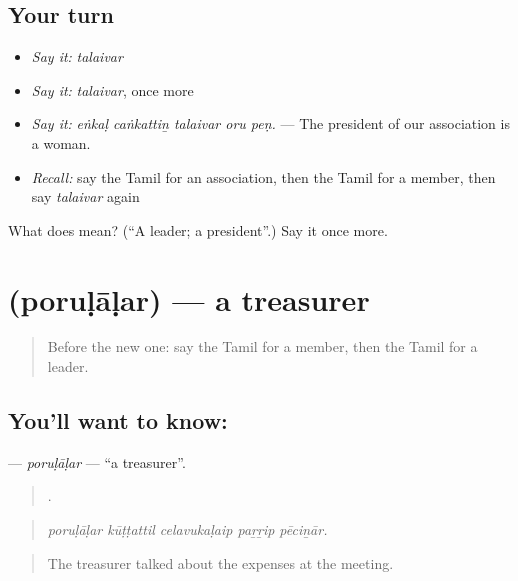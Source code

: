 \subsection*{Your turn}
\begin{itemize}
\raggedright
  \item \emph{Say it:} \emph{talaivar}
  \item \emph{Say it:} \emph{talaivar}, once more
  \item \emph{Say it:} \emph{eṅkaḷ caṅkattiṉ talaivar oru peṇ.} — The president of our association is a woman.
  \item \emph{Recall:} say the Tamil for an association, then the Tamil for a member, then say \emph{talaivar} again
\end{itemize}

\begin{tcolorbox}[breakable,colback=teal!4,colframe=teal!35!black,title={Before you move on}]
What does  mean? (\textquotedblleft{}A leader; a president\textquotedblright{}.) Say it once more.
\end{tcolorbox}
\section[\texorpdfstring{\ta{பொருளாளர்} (poruḷāḷar)}{பொருளாளர் (poruḷāḷar)}]{ (poruḷāḷar) — a treasurer}

\label{lesson:TA-C378-porulalar}



\begin{quote}
Before the new one: say the Tamil for a member, then the Tamil for a leader.
\end{quote}

\subsection*{You'll want to know: }
\textbf{} — \emph{poruḷāḷar} — \textquotedblleft{}a treasurer\textquotedblright{}.

\begin{quote}
    .
\end{quote}

\begin{quote}
\emph{poruḷāḷar kūṭṭattil celavukaḷaip paṟṟip pēciṉār.}
\end{quote}

\begin{quote}
The treasurer talked about the expenses at the meeting.
\end{quote}

